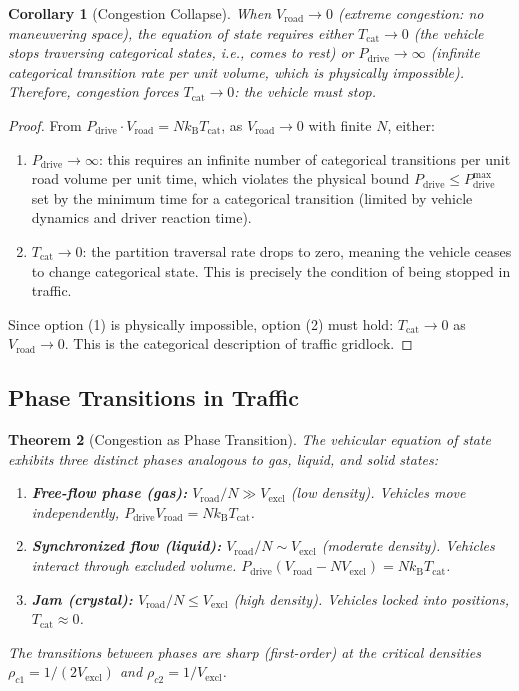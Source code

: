 \documentclass[twocolumn,10pt]{article}
\newtheorem{theorem}{Theorem}[section]
\newtheorem{corollary}[theorem]{Corollary}
\newcommand{\kB}{k_{\mathrm{B}}}
\newcommand{\Tcat}{T_{\mathrm{cat}}}
\newcommand{\Pdrive}{P_{\mathrm{drive}}}
\newcommand{\Vroad}{V_{\mathrm{road}}}
\newcommand{\Vexcl}{V_{\mathrm{excl}}}
\begin{document}
\begin{corollary}[Congestion Collapse]\label{cor:congestion}
When $\Vroad \to 0$ (extreme congestion: no maneuvering space), the equation of state requires either $\Tcat \to 0$ (the vehicle stops traversing categorical states, i.e., comes to rest) or $\Pdrive \to \infty$ (infinite categorical transition rate per unit volume, which is physically impossible). Therefore, congestion forces $\Tcat \to 0$: the vehicle must stop.
\end{corollary}

\begin{proof}
From $\Pdrive \cdot \Vroad = N \kB \Tcat$, as $\Vroad \to 0$ with finite $N$, either:
\begin{enumerate}
    \item $\Pdrive \to \infty$: this requires an infinite number of categorical transitions per unit road volume per unit time, which violates the physical bound $\Pdrive \leq \Pdrive^{\max}$ set by the minimum time for a categorical transition (limited by vehicle dynamics and driver reaction time).
    \item $\Tcat \to 0$: the partition traversal rate drops to zero, meaning the vehicle ceases to change categorical state. This is precisely the condition of being stopped in traffic.
\end{enumerate}
Since option (1) is physically impossible, option (2) must hold: $\Tcat \to 0$ as $\Vroad \to 0$. This is the categorical description of traffic gridlock.
\end{proof}

\subsection{Phase Transitions in Traffic}

\begin{theorem}[Congestion as Phase Transition]\label{thm:phasetransition}
The vehicular equation of state exhibits three distinct phases analogous to gas, liquid, and solid states:
\begin{enumerate}
    \item \textbf{Free-flow phase (gas):} $\Vroad / N \gg \Vexcl$ (low density). Vehicles move independently, $\Pdrive \Vroad = N\kB\Tcat$.
    \item \textbf{Synchronized flow (liquid):} $\Vroad / N \sim \Vexcl$ (moderate density). Vehicles interact through excluded volume. $\Pdrive(\Vroad - N\Vexcl) = N\kB\Tcat$.
    \item \textbf{Jam (crystal):} $\Vroad / N \leq \Vexcl$ (high density). Vehicles locked into positions, $\Tcat \approx 0$.
\end{enumerate}
The transitions between phases are sharp (first-order) at the critical densities $\rho_{c1} = 1/(2\Vexcl)$ and $\rho_{c2} = 1/\Vexcl$.
\end{theorem}
\end{document}
